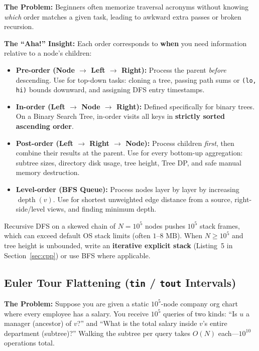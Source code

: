 \documentclass[11pt,a4paper]{article}
\theoremstyle{definition}
\newcommand{\painbeat}{\textbf{\color{accentamber}The Problem:} }
\newcommand{\ahabeat}{\textbf{\color{accentteal}The ``Aha!'' Insight:} }
\begin{document}
\painbeat Beginners often memorize traversal acronyms without knowing \emph{which} order matches a given task, leading to awkward extra passes or broken recursion.

\ahabeat Each order corresponds to \textbf{when} you need information relative to a node's children:
\begin{itemize}
    \item \textbf{Pre-order (Node $\to$ Left $\to$ Right):} Process the parent \emph{before} descending. Use for top-down tasks: cloning a tree, passing path sums or \texttt{(lo, hi)} bounds downward, and assigning DFS entry timestamps.
    \item \textbf{In-order (Left $\to$ Node $\to$ Right):} Defined specifically for binary trees. On a Binary Search Tree, in-order visits all keys in \textbf{strictly sorted ascending order}.
    \item \textbf{Post-order (Left $\to$ Right $\to$ Node):} Process children \emph{first}, then combine their results at the parent. Use for every bottom-up aggregation: subtree sizes, directory disk usage, tree height, Tree DP, and safe manual memory destruction.
    \item \textbf{Level-order (BFS Queue):} Process nodes layer by layer by increasing $\operatorname{depth}(v)$. Use for shortest unweighted edge distance from a source, right-side/level views, and finding minimum depth.
\end{itemize}

\begin{watchoutbox}
Recursive DFS on a skewed chain of $N = 10^5$ nodes pushes $10^5$ stack frames, which can exceed default OS stack limits (often $1$--$8\text{ MB}$). When $N \ge 10^5$ and tree height is unbounded, write an \textbf{iterative explicit stack} (Listing~5 in Section~\ref{sec:cpp}) or use BFS where applicable.
\end{watchoutbox}

\subsection{Euler Tour Flattening (\texttt{tin} / \texttt{tout} Intervals)}

\painbeat Suppose you are given a static $10^5$-node company org chart where every employee has a salary. You receive $10^5$ queries of two kinds: ``Is $u$ a manager (ancestor) of $v$?'' and ``What is the total salary inside $v$'s entire department (subtree)?'' Walking the subtree per query takes $O(N)$ each---$10^{10}$ operations total.
\end{document}

